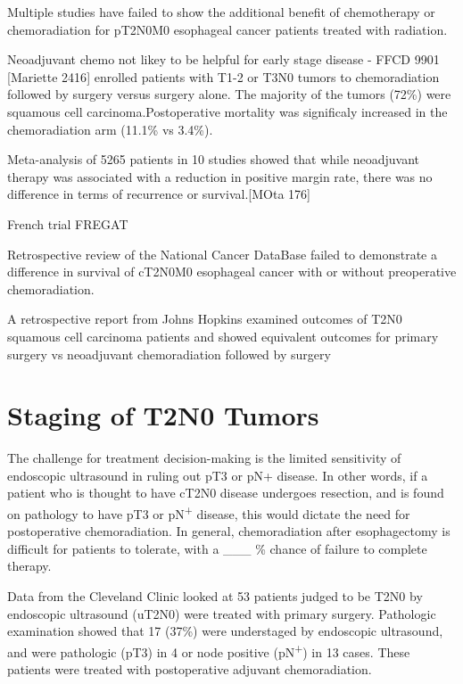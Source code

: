 \documentclass[
]{book}
\begin{document}
Multiple studies have failed to show the additional benefit of chemotherapy or chemoradiation for pT2N0M0 esophageal cancer patients treated with radiation.

Neoadjuvant chemo not likey to be helpful for early stage disease - FFCD 9901 {[}Mariette 2416{]} enrolled patients with T1-2 or T3N0 tumors to chemoradiation followed by surgery versus surgery alone. The majority of the tumors (72\%) were squamous cell carcinoma.Postoperative mortality was significaly increased in the chemoradiation arm (11.1\% vs 3.4\%).

Meta-analysis of 5265 patients in 10 studies showed that while neoadjuvant therapy was associated with a reduction in positive margin rate, there was no difference in terms of recurrence or survival.{[}MOta 176{]}

French trial FREGAT\citep{markar59}

Retrospective review of the National Cancer DataBase failed to demonstrate a difference in survival of cT2N0M0 esophageal cancer with or without preoperative chemoradiation.\citep{speicher1195}

A retrospective report from Johns Hopkins examined outcomes of T2N0 squamous cell carcinoma patients and showed equivalent outcomes for primary surgery vs neoadjuvant chemoradiation followed by surgery \citep{zhang429}

\hypertarget{staging-of-t2n0-tumors}{%
\section{Staging of T2N0 Tumors}\label{staging-of-t2n0-tumors}}

The challenge for treatment decision-making is the limited sensitivity of endoscopic ultrasound in ruling out pT3 or pN+ disease. In other words, if a patient who is thought to have cT2N0 disease undergoes resection, and is found on pathology to have pT3 or pN\textsuperscript{+} disease, this would dictate the need for postoperative chemoradiation. In general, chemoradiation after esophagectomy is difficult for patients to tolerate, with a \_\_\_ \% chance of failure to complete therapy.

Data from the Cleveland Clinic looked at 53 patients judged to be T2N0 by endoscopic ultrasound (uT2N0) were treated with primary surgery. Pathologic examination showed that 17 (37\%) were understaged by endoscopic ultrasound, and were pathologic (pT3) in 4 or node positive (pN\textsuperscript{+}) in 13 cases. These patients were treated with postoperative adjuvant chemoradiation.\citep{rice317}
\end{document}
